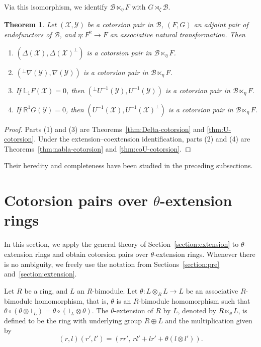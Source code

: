 \documentclass[11pt,reqno]{amsart}
\numberwithin{equation}{section}
\newtheorem{theorem}{Theorem}[section]
\newcommand{\cB}{\mathcal B}
\newcommand{\cX}{\mathcal X}
\newcommand{\cY}{\mathcal Y}
\begin{document}
Via this isomorphism, we identify $\cB\ltimes_\eta F$ with $G\rtimes_\zeta \cB$.

\begin{theorem}
Let $(\cX,\cY)$ be a cotorsion pair in $\cB$, $(F,G)$ an adjoint pair of endofunctors of $\cB$, and $\eta\colon F^2\to F$ an associative natural transformation.
Then %
\begin{enumerate}[label=\textup{(\arabic*)}]
\item $(\Delta(\cX), \Delta(\cX)^\perp)$ is a cotorsion pair in $\cB\ltimes_\eta F$.
\item $({}^\perp\nabla(\cY), \nabla(\cY))$ is a cotorsion pair in $\cB\ltimes_\eta F$.
\item If $\mathbb{L}_1F(\cX)=0$, then $({}^\perp U^{-1}(\cY), U^{-1}(\cY))$ is a cotorsion pair in $\cB\ltimes_\eta F$.
\item If $\mathbb{R}^1G(\cY)=0$, then $(U^{-1}(\cX),U^{-1}(\cX)^{\perp})$ is a cotorsion pair in $\cB\ltimes_\eta F$.
\end{enumerate}
\end{theorem}
\begin{proof}
Parts (1) and (3) are Theorems~\ref{thm:Delta-cotorsion} and \ref{thm:U-cotorsion}. Under the extension--coextension identification, parts (2) and (4) are Theorems~\ref{thm:nabla-cotorsion} and \ref{thm:coU-cotorsion}.
\end{proof}

Their heredity and completeness have been studied in the preceding subsections.



\section{Cotorsion pairs over \texorpdfstring{$\theta$}{theta}-extension rings}\label{section:theta}

In this section, we apply the general theory of Section~\ref{section:extension} to $\theta$-extension rings and obtain cotorsion pairs over $\theta$-extension rings.
Whenever there is no ambiguity, we freely use the notation from Sections~\ref{section:pre} and~\ref{section:extension}.


Let $R$ be a ring, and $L$ an $R$-bimodule. Let
$
\theta\colon L\otimes_RL\to L
$
be an associative $R$-bimodule homomorphism, that is, $\theta$ is an $R$-bimodule homomorphism such that
$
\theta\circ (\theta\otimes 1_L)=\theta\circ(1_L\otimes\theta).
$
The $\theta$-extension of $R$ by $L$, denoted by $R\ltimes_\theta L$, is defined to be the ring with underlying group $R\oplus L$
and the multiplication given by
\[
(r,l)(r',l')=(rr',\,rl'+lr'+\theta(l\otimes l')).
\]
\end{document}
